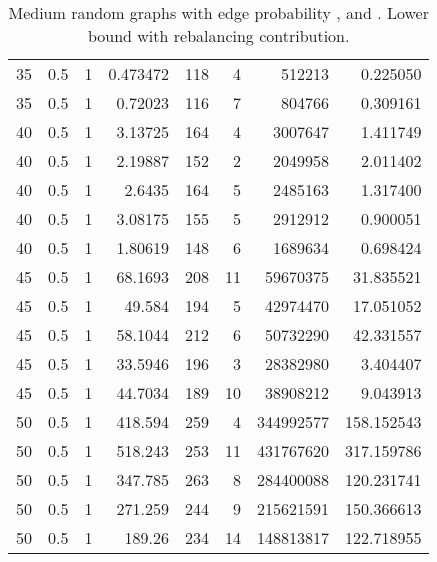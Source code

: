 \documentclass[a4paper,11pt]{article}
\begin{document}
\begin{table}
\begin{center}
\begin{tabular}{|rrr|r|r|rr|r|}
35 & 0.5 & 1 & 0.473472 & 118 & 4 & 512213 & 0.225050 \\
35 & 0.5 & 1 & 0.72023 & 116 & 7 & 804766 & 0.309161 \\
40 & 0.5 & 1 & 3.13725 & 164 & 4 & 3007647 & 1.411749 \\
40 & 0.5 & 1 & 2.19887 & 152 & 2 & 2049958 & 2.011402 \\
40 & 0.5 & 1 & 2.6435 & 164 & 5 & 2485163 & 1.317400 \\
40 & 0.5 & 1 & 3.08175 & 155 & 5 & 2912912 & 0.900051 \\
40 & 0.5 & 1 & 1.80619 & 148 & 6 & 1689634 & 0.698424 \\
45 & 0.5 & 1 & 68.1693 & 208 & 11 & 59670375 & 31.835521 \\
45 & 0.5 & 1 & 49.584 & 194 & 5 & 42974470 & 17.051052 \\
45 & 0.5 & 1 & 58.1044 & 212 & 6 & 50732290 & 42.331557 \\
45 & 0.5 & 1 & 33.5946 & 196 & 3 & 28382980 & 3.404407 \\
45 & 0.5 & 1 & 44.7034 & 189 & 10 & 38908212 & 9.043913 \\
50 & 0.5 & 1 & 418.594 & 259 & 4 & 344992577 & 158.152543 \\
50 & 0.5 & 1 & 518.243 & 253 & 11 & 431767620 & 317.159786 \\
50 & 0.5 & 1 & 347.785 & 263 & 8 & 284400088 & 120.231741 \\
50 & 0.5 & 1 & 271.259 & 244 & 9 & 215621591 & 150.366613 \\
50 & 0.5 & 1 & 189.26 & 234 & 14 & 148813817 & 122.718955 \\
\hline
\end{tabular}
\end{center}
\caption{Medium random graphs with edge probability ,
   and . Lower bound with rebalancing
  contribution.}
\label{tab:medium-rebal}
\end{table}
\end{document}
